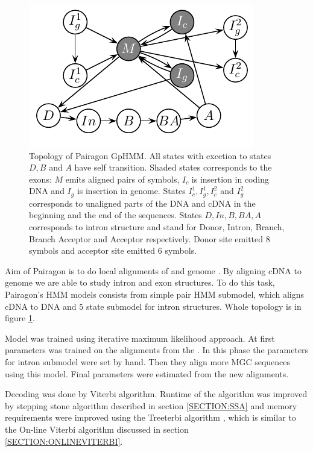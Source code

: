 \begin{figure}
\begin{center}
\includegraphics{../figures/pairagon.pdf}
\end{center}
\caption[Topology of Pairagon generalized pair hidden Markov model.]{
Topology of Pairagon GpHMM. All states with excetion to states
$D,B$ and $A$ have self transition.
Shaded states corresponds to the exons: $M$ emits
aligned pairs of symbols, $I_c$ is insertion in coding DNA and $I_g$ is
insertion in genome. States $I^1_c,I^1_g,I^2_c$ and $I^2_g$ corresponds to
unaligned parts of the DNA and cDNA in the beginning and the end of the
sequences. States $D,In,B,BA,A$ corresponds to intron structure and stand for 
Donor, Intron, Branch, Branch Acceptor and Acceptor respectively.
Donor site emitted $8$ symbols and acceptor site emitted $6$ symbols.
}\label{FIGURE:PAIRAGON}
\end{figure}


Aim of Pairagon is to do local alignments of  and
genome \cite{Pairagon2009}. By aligning cDNA to genome we are able to study
intron and exon structures.  To do this task, Pairagon's HMM models consists
from simple pair HMM submodel, which aligns cDNA to DNA and $5$ state submodel
for intron structures.  Whole topology is in figure \ref{FIGURE:PAIRAGON}. 

Model was trained using iterative maximum likelihood approach. At first
parameters was trained on the alignments from the . In this phase the parameters for intron submodel were set by
hand. Then they align more MGC sequences using this model. Final parameters were
estimated from the new alignments.

Decoding was done by Viterbi algorithm. Runtime of the algorithm was improved by
stepping stone algorithm described in section \ref{SECTION:SSA} and memory
requirements were improved using the Treeterbi algorithm \cite{Keibler2007},
which is similar to the On-line Viterbi algorithm discussed in section
\ref{SECTION:ONLINEVITERBI}.

